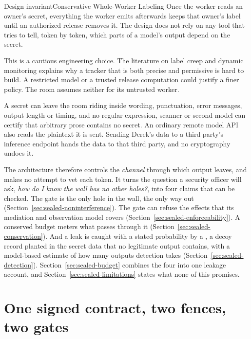\documentclass[11pt,a4paper]{article}
\theoremstyle{definition}
\begin{document}
\begin{pdclaim}{Design invariant}{Conservative Whole-Worker Labeling}
\setlength{\parskip}{4pt plus 1pt}
\label{hyp:sealed-taint}
Once the worker reads an owner's secret, everything the worker emits
afterwards keeps that owner's label until an authorized release removes it.
The design does not rely on any tool that tries to tell, token by token,
which parts of a model's output depend on the secret.

This is a cautious engineering choice. The literature on label creep and
dynamic monitoring  explains why a tracker that is both
precise and permissive is hard to build. A restricted model or a trusted
release computation could justify a finer policy. The room assumes neither for
its untrusted worker.
\end{pdclaim}

A secret can leave the room riding inside wording, punctuation, error
messages, output length or timing, and no regular expression, scanner or second model can certify that
arbitrary prose contains no secret. An ordinary remote model API also reads
the plaintext it is sent. Sending Derek's data to a third party's inference
endpoint hands the data to that third party, and no cryptography undoes it.

The architecture therefore controls the \emph{channel} through which output
leaves, and makes no attempt to vet each token. It turns the question a
security officer will ask, \emph{how do I know the wall has no other holes?},
into four claims that can be checked. The gate is the only hole in the wall,
the only way out (Section~\ref{sec:sealed-noninterference}). The gate can refuse the effects
that its mediation and observation model covers
(Section~\ref{sec:sealed-enforceability}). A conserved budget meters what
passes through it (Section~\ref{sec:sealed-conservation}). And a leak is
caught with a stated probability by a , a decoy record planted
in the secret data that no legitimate output contains, with a model-based
estimate of how many outputs detection takes
(Section~\ref{sec:sealed-detection}). Section~\ref{sec:sealed-budget} combines
the four into one leakage account, and Section~\ref{sec:sealed-limitations}
states what none of this promises.

\section{One signed contract, two fences, two gates}\label{sec:sealed-design}
\end{document}

